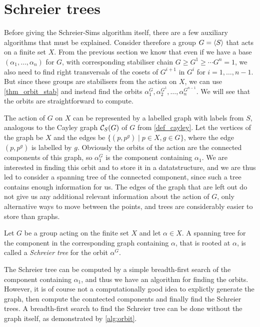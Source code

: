 \section{Schreier trees}
Before giving the Schreier-Sims algorithm itself, there are a few
auxiliary algorithms that must be explained. Consider therefore a
group $G = \left\langle S \right\rangle$ that acts on a finite set $X$. From the previous
section we know that even if we have a base $(\alpha_1, \dotsc,
\alpha_n)$ for $G$, with corresponding stabiliser chain $G \geq G^1
\geq \dotsb G^n = 1$, we also need to find right transversals of the cosets of
$G^{i + 1}$ in $G^i$ for $i = 1, \dotsc, n - 1$. But since these groups
are stabilisers from the action on $X$, we can use
\ref{thm_orbit_stab} and instead find the orbits $\alpha_1^G,
\alpha_2^{G^1}, \dotsc, \alpha_n^{G^{n - 1}}$. We will see that the orbits are straightforward to compute.

The action of $G$ on $X$ can be represented by a labelled graph with
labels from $S$, analogous to the Cayley graph $\mathcal{C}_S(G)$ of $G$ from
\ref{def_cayley}. Let the vertices of the graph be $X$ and the edges
be $\{(p, p^g) \mid p \in X, g \in G\}$, where the edge $(p, p^g)$ is
labelled by $g$. Obviously the orbits of the action are the connected
components of this graph, so $\alpha_1^G$ is the component containing
$\alpha_1$. We are interested in finding this orbit and to store it in
a datatstructure, and we are thus led to consider a spanning tree of
the connected component, since such a tree contains enough information
for us. The edges of the graph that are left out do not give us any
additional relevant information about the action of $G$, only
alternative ways to move between the points, and trees are
considerably easier to store than graphs.

\begin{deff} \label{def_bsgs}
  Let $G$ be a group acting on the finite set $X$ and let $\alpha \in
  X$. A spanning tree for the component in the corresponding graph
  containing $\alpha$, that is rooted at $\alpha$, is called a
  \emph{Schreier tree} for the orbit $\alpha^G$.
\end{deff}

The Schreier tree can be computed by a simple breadth-first search of
the component containing $\alpha_1$, and thus we have an algorithm for
finding the orbits. However, it is of course not a computationally
good idea to explictly generate the graph, then compute the conntected
components and finally find the Schreier trees. A breadth-first search
to find the Schreier tree can be done without the graph itself, as
demonstrated by \ref{alg:orbit}.

